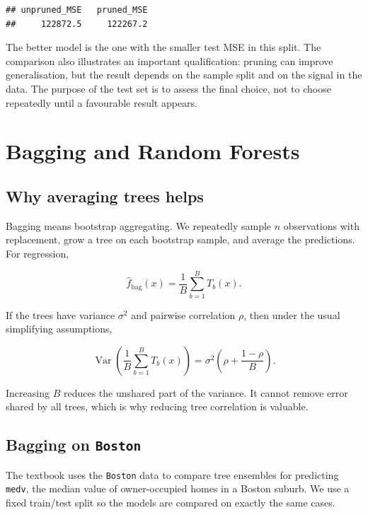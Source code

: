 \documentclass[
  11pt,
]{article}
\begin{document}
\begin{verbatim}
## unpruned_MSE   pruned_MSE 
##     122872.5     122267.2
\end{verbatim}

The better model is the one with the smaller test MSE in this split. The
comparison also illustrates an important qualification: pruning can
improve generalisation, but the result depends on the sample split and
on the signal in the data. The purpose of the test set is to assess the
final choice, not to choose repeatedly until a favourable result
appears.

\section{Bagging and Random Forests}\label{bagging-and-random-forests}

\subsection{Why averaging trees helps}\label{why-averaging-trees-helps}

Bagging means bootstrap aggregating. We repeatedly sample \(n\)
observations with replacement, grow a tree on each bootstrap sample, and
average the predictions. For regression,

\[
\hat f_{\mathrm{bag}}(x) = \frac{1}{B}\sum_{b=1}^{B}T_b(x).
\]

If the trees have variance \(\sigma^2\) and pairwise correlation
\(\rho\), then under the usual simplifying assumptions,

\[
\operatorname{Var}\left(\frac{1}{B}\sum_{b=1}^{B}T_b(x)\right)
= \sigma^2\left(\rho + \frac{1-\rho}{B}\right).
\]

Increasing \(B\) reduces the unshared part of the variance. It cannot
remove error shared by all trees, which is why reducing tree correlation
is valuable.

\subsection{\texorpdfstring{Bagging on
\texttt{Boston}}{Bagging on Boston}}\label{bagging-on-boston}

The textbook uses the \texttt{Boston} data to compare tree ensembles for
predicting \texttt{medv}, the median value of owner-occupied homes in a
Boston suburb. We use a fixed train/test split so the models are
compared on exactly the same cases.
\end{document}
